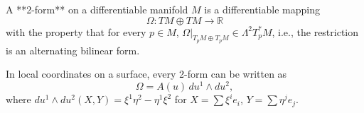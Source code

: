 A **2-form** on a differentiable manifold $M$ is a differentiable mapping
$$\Omega: TM \oplus TM \to \mathbb{R}$$
with the property that for every $p \in M$, $\Omega|_{T_pM \oplus T_pM} \in \Lambda^2 T_p^*M$, i.e., the restriction is an alternating bilinear form.

In local coordinates on a surface, every 2-form can be written as
$$\Omega = A(u) \, du^1 \wedge du^2,$$
where $du^1 \wedge du^2(X,Y) = \xi^1 \eta^2 - \eta^1 \xi^2$ for $X = \sum \xi^i e_i$, $Y = \sum \eta^j e_j$.
